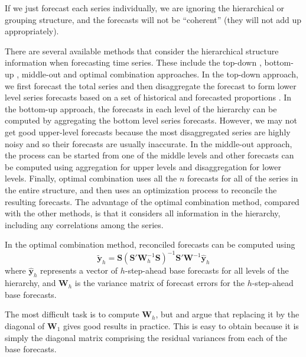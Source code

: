 \documentclass[11pt,a4paper,]{article}
\begin{document}
If we just forecast each series individually, we are ignoring the hierarchical or grouping structure, and the forecasts will not be ``coherent'' (they will not add up appropriately).

There are several available methods that consider the hierarchical structure information when forecasting time series. These include the top-down \autocites{gross1990disaggregation}{fliedner2001hierarchical}, bottom-up \autocite{kahn1998revisiting}, middle-out and optimal combination \autocite{hyndman2011optimal} approaches. In the top-down approach, we first forecast the total series and then disaggregate the forecast to form lower level series forecasts based on a set of historical and forecasted proportions \autocite[for details see][]{athanasopoulos2009hierarchical}. In the bottom-up approach, the forecasts in each level of the hierarchy can be computed by aggregating the bottom level series forecasts. However, we may not get good upper-level forecasts because the most disaggregated series are highly noisy and so their forecasts are usually inaccurate. In the middle-out approach, the process can be started from one of the middle levels and other forecasts can be computed using aggregation for upper levels and disaggregation for lower levels. Finally, optimal combination uses all the \(n\) forecasts for all of the series in the entire structure, and then uses an optimization process to reconcile the resulting forecasts. The advantage of the optimal combination method, compared with the other methods, is that it considers all information in the hierarchy, including any correlations among the series.

In the optimal combination method, reconciled forecasts can be computed using \autocite{mint2018}
\begin{equation}\label{mint}
  \tilde{\bm{y}}_{h}=\bm{S}(\bm{S}'\bm{W}_h^{-1}\bm{S})^{-1}\bm{S}'\bm{W}^{-1}\hat{\bm{y}}_h
\end{equation}
where \(\hat{\bm{y}}_h\) represents a vector of \(h\)-step-ahead base forecasts for all levels of the hierarchy, and \(\bm{W}_h\) is the variance matrix of forecast errors for the \(h\)-step-ahead base forecasts.

The most difficult task is to compute \(\bm{W}_h\), but \textcite{mint2018} and \textcite{hyndman2016fast} argue that replacing it by the diagonal of \(\bm{W}_1\) gives good results in practice. This is easy to obtain because it is simply the diagonal matrix comprising the residual variances from each of the base forecasts.
\end{document}
